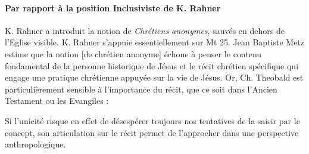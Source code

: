 \paragraph{Par rapport à la position Inclusiviste de  K. Rahner} K. Rahner a introduit la notion de \textit{Chrétiens anonymes}, sauvés en dehors de l'Eglise visible. K. Rahner s'appuie essentiellement sur Mt 25. Jean Baptiste Metz estime que la notion [de chrétien anonyme] échoue à penser le contenu fondamental de la personne historique de Jésus et le récit chrétien spécifique qui engage une pratique chrétienne appuyée sur la vie de Jésus. \cite[p. 83]{cheno_dieu_2017} Or, Ch. Theobald est particulièrement sensible à l'importance du récit, que ce soit dans l'Ancien Testament ou les Evangiles : 
\begin{singlequote}
     Si l'unicité risque en effet de désespérer toujours nos tentatives de la saisir par le concept, son articulation sur le récit permet de l'approcher dans une perspective anthropologique. \cite{centre_sevres_paris_unique_1996}
\end{singlequote}


\begin{comment}
    il faut ajouter un quatrième qui ne fait pas nombre avec les précédents : le récit. Jean Lambert note l'importance capitale de la "narrativité sémitique dans les trois monothéismes, qui leur permet de gérer, chaque fois de manière spécifique, leur rapport au temps et à l'histoire. Paul Beauchamp montre dans \textit{L'un et l'autre Testament II }ie lien intime entre confession de l'unicité et récit: 
\begin{quote}
    "la nécessité, selon ses propres termes, que l'Un soit manifesté par le récit orientant le pluriel"10
\end{quote}. Si l'unicité risque en effet de désespérer toujours nos tentatives de la saisir par le concept, son articulation sur le récit permet de l'approcher dans une perspective anthropologique
\end{comment}


